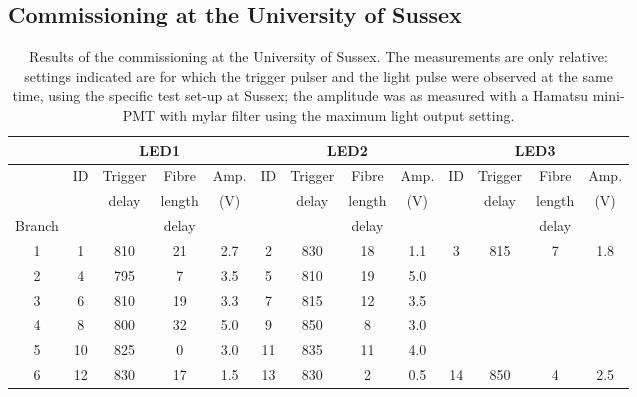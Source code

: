 

\subsection*{Commissioning at the University of Sussex}

\begin{table}[h!]
  \begin{center}
    \caption{Results of the commissioning at the University of Sussex. The measurements are only relative: settings indicated are for which the trigger pulser and the light pulse were observed at the same time, using the specific test set-up at Sussex; the amplitude was as measured with a Hamatsu mini-PMT with mylar filter using the maximum light output setting.}
    \label{tab:sussex_commissioining}
    \begin{tabular}{|c|c|c|c|c|c|c|c|c|c|c|c|c|} 
	\hline
	 & \multicolumn{4}{c|}{LED1} & \multicolumn{4}{c|}{LED2} & \multicolumn{4}{c|}{LED3} \\
	\hline
		        & ID & Trigger  & Fibre  & Amp.
		        & ID & Trigger  & Fibre  & Amp.
		        & ID & Trigger  & Fibre  & Amp. \\
	              &     & delay & length & (V) 
			 &     & delay & length & (V) 
                    &     & delay & length & (V) \\
	Branch    & & & delay & & & & delay & & & & delay & \\
       \hline 
	1 & 1 & 810 & 21 & 2.7 & 2 & 830 & 18 & 1.1 & 3 & 815 & 7 & 1.8 \\
	2 & 4 & 795 & 7  & 3.5 & 5 & 810 & 19 & 5.0 & & & & \\
	3 & 6 & 810 & 19 & 3.3 & 7 & 815 & 12 & 3.5 & & & & \\
	4 & 8 & 800 & 32 & 5.0 & 9 & 850 & 8 & 3.0 & & & & \\
	5 & 10 & 825 & 0 & 3.0 & 11 & 835 & 11 & 4.0 & & & & \\
	6 & 12 & 830 & 17 & 1.5 & 13 & 830 & 2 & 0.5 & 14 & 850 & 4 & 2.5 \\
	\hline
    \end{tabular}
  \end{center}
\end{table}